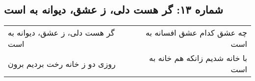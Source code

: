 \begin{center}
\section*{شماره ۱۳: گر هست دلی، ز عشق، دیوانه به است}
\label{sec:013}
\begin{longtable}{l p{0.5cm} r}
گر هست دلی، ز عشق، دیوانه به است
&&
چه عشق کدام عشق افسانه به است
\\
روزی دو ز خانه رخت بردیم برون
&&
با خانه شدیم زانکه هم خانه به است
\\
\end{longtable}
\end{center}
